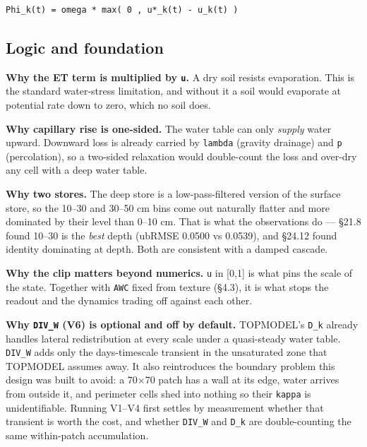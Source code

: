 \documentclass[10pt,a4paper]{article}
\begin{document}
\begin{Verbatim}[fontsize=\scriptsize,frame=leftline,framerule=0.6pt,rulecolor=\color{rulegray},xleftmargin=6pt,framesep=6pt,]
   Phi_k(t) = omega * max( 0 , u*_k(t) - u_k(t) )
\end{Verbatim}

\subsection*{Logic and foundation}

\textbf{Why the ET term is multiplied by \texttt{u}.} A dry soil resists evaporation. This
is the standard water-stress limitation, and without it a soil would evaporate
at potential rate down to zero, which no soil does.

\textbf{Why capillary rise is one-sided.} The water table can only \emph{supply} water
upward. Downward loss is already carried by \texttt{lambda} (gravity drainage) and \texttt{p}
(percolation), so a two-sided relaxation would double-count the loss and
over-dry any cell with a deep water table.

\textbf{Why two stores.} The deep store is a low-pass-filtered version of the surface
store, so the 10–30 and 30–50 cm bins come out naturally flatter and more
dominated by their level than 0–10 cm. That is what the observations do — §21.8
found 10–30 is the \emph{best} depth (ubRMSE 0.0500 vs 0.0539), and §24.12 found
identity dominating at depth. Both are consistent with a damped cascade.

\textbf{Why the clip matters beyond numerics.} \texttt{u} in [0,1] is what pins the scale of
the state. Together with \texttt{AWC} fixed from texture (§4.3), it is what stops the
readout and the dynamics trading off against each other.

\textbf{Why \texttt{DIV\_W} (V6) is optional and off by default.} TOPMODEL's \texttt{D\_k} already
handles lateral redistribution at every scale under a quasi-steady water table.
\texttt{DIV\_W} adds only the days-timescale transient in the unsaturated zone that
TOPMODEL assumes away. It also reintroduces the boundary problem this design was
built to avoid: a 70×70 patch has a wall at its edge, water arrives from
outside it, and perimeter cells shed into nothing so their \texttt{kappa} is
unidentifiable. Running V1–V4 first settles by measurement whether that
transient is worth the cost, and whether \texttt{DIV\_W} and \texttt{D\_k} are double-counting
the same within-patch accumulation.
\end{document}
